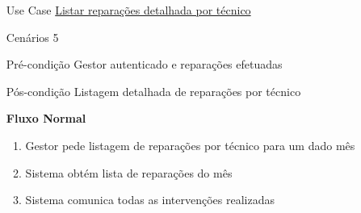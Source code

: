 \documentclass[../relatorio.tex]{subfiles}
\begin{document}
\begin{itemize}
    \item[Use Case] {\underline{Listar reparações detalhada por técnico}}
    \item[Cenários] {5}
    \item[Pré-condição] {Gestor autenticado e reparações efetuadas}
    \item[Pós-condição] {Listagem detalhada de reparações por técnico}
          \begin{flushleft}
              \textbf{Fluxo Normal}
          \end{flushleft}
          \begin{enumerate}
              \item Gestor pede listagem de reparações por técnico para um dado mês
              \item Sistema obtém lista de reparações do mês
              \item Sistema comunica todas as intervenções realizadas
          \end{enumerate}
\end{itemize}
\end{document}

